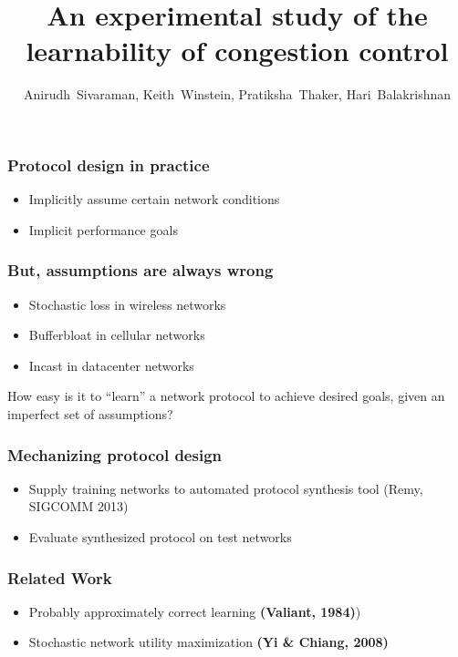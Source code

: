 \documentclass[svgnames]{beamer}
\title{An experimental study of the learnability of congestion control}
\author{Anirudh~Sivaraman, Keith~Winstein, Pratiksha~Thaker, Hari~Balakrishnan}
\institute{MIT CSAIL\vspace{\baselineskip}}
\begin{document}
\begin{frame}

\titlepage

\end{frame}

\begin{Large}
\begin{frame}
\frametitle{Protocol design in practice}
\begin{itemize}
\item<1-> Implicitly assume certain network conditions
\item<2-> Implicit performance goals
\end{itemize}
\end{frame}

\begin{frame}
\frametitle{But, assumptions are always wrong}
\begin{itemize}
\item<1-> Stochastic loss in wireless networks
\item<2-> Bufferbloat in cellular networks
\item<3-> Incast in datacenter networks
\end{itemize}
\end{frame}

\begin{frame}
\begin{center}
How easy is it to “learn” a network protocol to achieve desired goals, given
an imperfect set of assumptions?
\end{center}
\end{frame}

\begin{frame}
\frametitle{Mechanizing protocol design}
\begin{itemize}
\item <1->Supply training networks to automated protocol synthesis tool (Remy, SIGCOMM 2013) 
\item <2->Evaluate synthesized protocol on test networks
\end{itemize}
\end{frame}







 



\begin{frame}
\frametitle{Related Work}
\begin{itemize}
\item Probably approximately correct learning \textbf{(Valiant, 1984)})
\item Stochastic network utility maximization \textbf{(Yi \& Chiang, 2008)}
\end{itemize}
\end{frame}


\end{Large}
\end{document}
